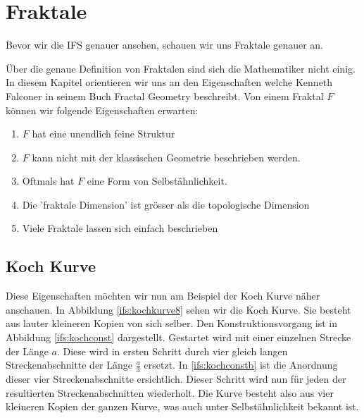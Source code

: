 %
%
%
\section{Fraktale
\label{ifs:section:teil1}}
Bevor wir die IFS genauer ansehen, schauen wir uns Fraktale genauer an.


Über die genaue Definition von Fraktalen sind sich die Mathematiker nicht einig. 
In diesem Kapitel orientieren wir uns an den Eigenschaften welche Kenneth Falconer in seinem Buch Fractal Geometry \cite{ifs:fractal-geometry} beschreibt.
Von einem Fraktal $F$ können wir folgende Eigenschaften erwarten:
\begin{enumerate}
	\item $F$ hat eine unendlich feine Struktur
	\item $F$ kann nicht mit der klassischen Geometrie beschrieben werden.
	\item Oftmals hat $F$ eine Form von Selbstähnlichkeit.
	\item Die 'fraktale Dimension' ist grösser als die topologische Dimension
	\item Viele Fraktale lassen sich einfach beschrieben
\end{enumerate}
\subsection{Koch Kurve
	\label{ifs:subsection:lilkoch}}
Diese Eigenschaften möchten wir nun am Beispiel der Koch Kurve näher anschauen.
In Abbildung \ref{ifs:kochkurve8} sehen wir die Koch Kurve. Sie besteht aus lauter kleineren Kopien von sich selber. 
Den Konstruktionsvorgang ist in Abbildung \ref{ifs:kochconst} dargestellt.
Gestartet wird mit einer einzelnen Strecke der Länge $a$.
Diese wird in ersten Schritt durch vier gleich langen Streckenabschnitte der Länge $\frac{a}{3}$ ersetzt.
In \ref{ifs:kochconstb} ist die Anordnung dieser vier Streckenabschnitte ersichtlich. 
Dieser Schritt wird nun für jeden der resultierten Streckenabschnitten wiederholt.
Die Kurve besteht also aus vier kleineren Kopien der ganzen Kurve, was auch unter Selbstähnlichkeit bekannt ist.


